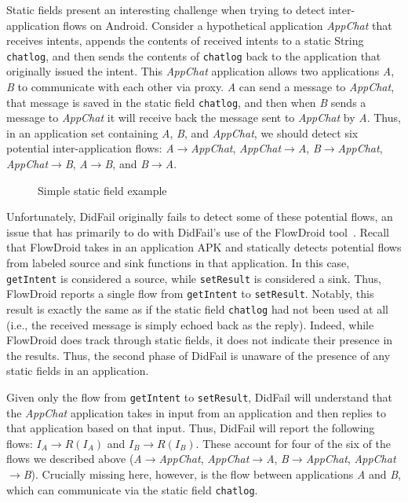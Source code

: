 Static fields present an interesting challenge when trying to detect inter-application flows on Android. Consider a hypothetical application \emph{AppChat} that receives intents, appends the contents of received intents to a static String \texttt{chatlog}, and then sends the contents of \texttt{chatlog} back to the application that originally issued the intent. This \emph{AppChat} application allows two applications \emph{A}, \emph{B} to communicate with each other via proxy. \emph{A} can send a message to \emph{AppChat}, that message is saved in the static field \texttt{chatlog}, and then when \emph{B} sends a message to \emph{AppChat} it will receive back the message sent to \emph{AppChat} by \emph{A}. Thus, in an application set containing \emph{A}, \emph{B}, and \emph{AppChat}, we should detect six potential inter-application flows: \emph{A$\rightarrow$AppChat}, \emph{AppChat$\rightarrow$A}, \emph{B$\rightarrow$AppChat}, \emph{AppChat$\rightarrow$B}, \emph{A$\rightarrow$B}, and \emph{B$\rightarrow$A}.

\begin{figure}
\begin{framed}

\caption{Simple static field example}
\label{fig:appchat}
\end{framed}
\end{figure}

Unfortunately, DidFail originally fails to detect some of these potential flows, an issue that has primarily to do with DidFail's use of the FlowDroid tool~\cite{flowdroid}. Recall that FlowDroid takes in an application APK and statically detects potential flows from labeled source and sink functions in that application. In this case, \texttt{getIntent} is considered a source, while \texttt{setResult} is considered a sink. Thus, FlowDroid reports a single flow from \texttt{getIntent} to \texttt{setResult}. Notably, this result is exactly the same as if the static field \texttt{chatlog} had not been used at all (i.e., the received message is simply echoed back as the reply). Indeed, while FlowDroid does track through static fields, it does not indicate their presence in the results. Thus, the second phase of DidFail is unaware of the presence of any static fields in an application.

Given only the flow from \texttt{getIntent} to \texttt{setResult}, DidFail will understand that the \emph{AppChat} application takes in input from an application and then replies to that application based on that input. Thus, DidFail will report the following flows: $I_A\rightarrow R(I_A)$ and $I_B\rightarrow R(I_B)$. These account for four of the six of the flows we described above (\emph{A$\rightarrow$AppChat}, \emph{AppChat$\rightarrow$A}, \emph{B$\rightarrow$AppChat}, \emph{AppChat$\rightarrow$B}). Crucially missing here, however, is the flow between applications \emph{A} and \emph{B}, which can communicate via the static field \texttt{chatlog}. 

